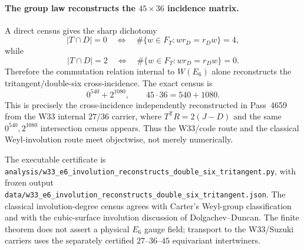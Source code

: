 \paragraph{The group law reconstructs the $45\times36$ incidence matrix.}
A direct census gives the sharp dichotomy
\[
 |T\cap D|=0
 \quad\Longleftrightarrow\quad
 \#\{w\in F_T:wr_D=r_Dw\}=4,
\]
while
\[
 |T\cap D|=2
 \quad\Longleftrightarrow\quad
 \#\{w\in F_T:wr_D=r_Dw\}=0.
\]
Therefore the commutation relation internal to $W(E_6)$ alone reconstructs the
tritangent/double-six cross-incidence.  The exact census is
\[
 \boxed{0^{540}+2^{1080}},
 \qquad 45\cdot36=540+1080.
\]
This is precisely the cross-incidence independently reconstructed in
Pass~4659 from the W33 internal $27/36$ carrier, where
$T^{\mathsf T}R=2(J-D)$ and the same $0^{540},2^{1080}$ intersection census
appears.  Thus the W33/code route and the classical Weyl-involution route meet
objectwise, not merely numerically.

The executable certificate is
\texttt{analysis/w33\_e6\_involution\_reconstructs\_double\_six\_tritangent.py},
with frozen output
\texttt{data/w33\_e6\_involution\_reconstructs\_double\_six\_tritangent.json}.
The classical involution-degree census agrees with Carter's Weyl-group
classification and with the cubic-surface involution discussion of
Dolgachev--Duncan.  The finite theorem does not assert a physical $E_6$ gauge
field; transport to the W33/Suzuki carriers uses the separately certified
$27$--$36$--$45$ equivariant intertwiners.

